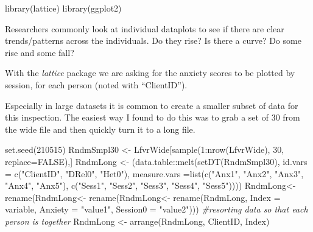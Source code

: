 \documentclass[
  11pt,
]{book}
\newenvironment{Shaded}{\begin{snugshade}}{\end{snugshade}}
\newcommand{\AttributeTok}[1]{\textcolor[rgb]{0.77,0.63,0.00}{#1}}
\newcommand{\CommentTok}[1]{\textcolor[rgb]{0.56,0.35,0.01}{\textit{#1}}}
\newcommand{\ConstantTok}[1]{\textcolor[rgb]{0.00,0.00,0.00}{#1}}
\newcommand{\DecValTok}[1]{\textcolor[rgb]{0.00,0.00,0.81}{#1}}
\newcommand{\FunctionTok}[1]{\textcolor[rgb]{0.00,0.00,0.00}{#1}}
\newcommand{\NormalTok}[1]{#1}
\newcommand{\OtherTok}[1]{\textcolor[rgb]{0.56,0.35,0.01}{#1}}
\newcommand{\SpecialCharTok}[1]{\textcolor[rgb]{0.00,0.00,0.00}{#1}}
\newcommand{\StringTok}[1]{\textcolor[rgb]{0.31,0.60,0.02}{#1}}
\begin{document}
\begin{Shaded}
\begin{Highlighting}[]
\FunctionTok{library}\NormalTok{(lattice)}
\FunctionTok{library}\NormalTok{(ggplot2)}
\end{Highlighting}
\end{Shaded}

Researchers commonly look at individual dataplots to see if there are clear trends/patterns across the individuals. Do they rise? Is there a curve? Do some rise and some fall?

With the \emph{lattice} package we are asking for the anxiety scores to be plotted by session, for each person (noted with ``ClientID'').

Especially in large datasets it is common to create a smaller subset of data for this inspection. The easiest way I found to do this was to grab a set of 30 from the wide file and then quickly turn it to a long file.

\begin{Shaded}
\begin{Highlighting}[]
\FunctionTok{set.seed}\NormalTok{(}\DecValTok{210515}\NormalTok{)}
\NormalTok{RndmSmpl30 }\OtherTok{\textless{}{-}}\NormalTok{ LfvrWide[}\FunctionTok{sample}\NormalTok{(}\DecValTok{1}\SpecialCharTok{:}\FunctionTok{nrow}\NormalTok{(LfvrWide), }\DecValTok{30}\NormalTok{,}
   \AttributeTok{replace=}\ConstantTok{FALSE}\NormalTok{),] }
\NormalTok{RndmLong }\OtherTok{\textless{}{-}}\NormalTok{ (data.table}\SpecialCharTok{::}\FunctionTok{melt}\NormalTok{(}\FunctionTok{setDT}\NormalTok{(RndmSmpl30), }\AttributeTok{id.vars =} \FunctionTok{c}\NormalTok{(}\StringTok{"ClientID"}\NormalTok{, }\StringTok{"DRel0"}\NormalTok{, }\StringTok{"Het0"}\NormalTok{), }\AttributeTok{measure.vars =}\FunctionTok{list}\NormalTok{(}\FunctionTok{c}\NormalTok{(}\StringTok{"Anx1"}\NormalTok{, }\StringTok{"Anx2"}\NormalTok{, }\StringTok{"Anx3"}\NormalTok{, }\StringTok{"Anx4"}\NormalTok{, }\StringTok{"Anx5"}\NormalTok{), }\FunctionTok{c}\NormalTok{(}\StringTok{"Sess1"}\NormalTok{, }\StringTok{"Sess2"}\NormalTok{, }\StringTok{"Sess3"}\NormalTok{, }\StringTok{"Sess4"}\NormalTok{, }\StringTok{"Sess5"}\NormalTok{))))}
\NormalTok{RndmLong}\OtherTok{\textless{}{-}}  \FunctionTok{rename}\NormalTok{(RndmLong}\OtherTok{\textless{}{-}}  \FunctionTok{rename}\NormalTok{(RndmLong}\OtherTok{\textless{}{-}}  \FunctionTok{rename}\NormalTok{(RndmLong, }\AttributeTok{Index =}\NormalTok{ variable, }\AttributeTok{Anxiety =} \StringTok{"value1"}\NormalTok{, }\AttributeTok{Session0 =} \StringTok{"value2"}\NormalTok{)))}
\CommentTok{\#resorting data so that each person is together}
\NormalTok{RndmLong }\OtherTok{\textless{}{-}} \FunctionTok{arrange}\NormalTok{(RndmLong, ClientID, Index)}
\end{Highlighting}
\end{Shaded}
\end{document}
